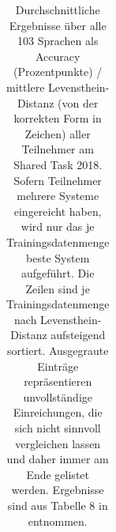 \documentclass[11pt,a4paper]{article}
\begin{document}
\begin{table}[tbh]
\begin{tabular}{lc|lc|lc}
\bottomrule
\end{tabular}
\caption{Durchschnittliche Ergebnisse über alle 103 Sprachen als Accuracy (Prozentpunkte) / mittlere Levensthein-Distanz (von der korrekten Form in Zeichen) aller Teilnehmer am Shared Task 2018.
Sofern Teilnehmer mehrere Systeme eingereicht haben, wird nur das je Trainingsdatenmenge beste System aufgeführt.
Die Zeilen sind je Trainingsdatenmenge nach Levensthein-Distanz aufsteigend sortiert.
Ausgegraute Einträge repräsentieren unvollständige Einreichungen, die sich nicht sinnvoll vergleichen lassen und daher immer am Ende gelistet werden.
Ergebnisse sind aus Tabelle 8 in \citet{sigmorphon:st2018} entnommen.}
\label{fig:results_all}
\end{table}

\end{document}
